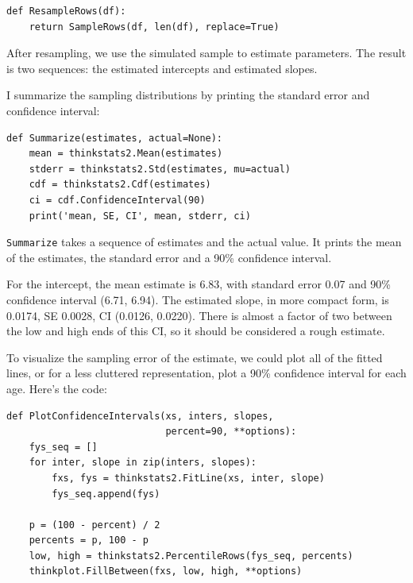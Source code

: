 \documentclass[12pt]{book}
\begin{document}
\begin{verbatim}
def ResampleRows(df):
    return SampleRows(df, len(df), replace=True)
\end{verbatim}

After resampling, we use the simulated sample to estimate parameters.
The result is two sequences: the estimated intercepts and estimated
slopes.

I summarize the sampling distributions by printing the standard
error and confidence interval:

\begin{verbatim}
def Summarize(estimates, actual=None):
    mean = thinkstats2.Mean(estimates)
    stderr = thinkstats2.Std(estimates, mu=actual)
    cdf = thinkstats2.Cdf(estimates)
    ci = cdf.ConfidenceInterval(90)
    print('mean, SE, CI', mean, stderr, ci)
\end{verbatim}

{\tt Summarize} takes a sequence of estimates and the actual value.
It prints the mean of the estimates, the standard error and 
a 90\% confidence interval.

For the intercept, the mean estimate is 6.83, with standard error
0.07 and 90\% confidence interval (6.71, 6.94).  The estimated slope, in
more compact form, is 0.0174, SE 0.0028, CI (0.0126, 0.0220).
There is almost a factor of two between the low and high ends of
this CI, so it should be considered a rough estimate.


To visualize the sampling error of the estimate, we could plot
all of the fitted lines, or for a less cluttered representation,
plot a 90\% confidence interval for each age.  Here's the code:

\begin{verbatim}
def PlotConfidenceIntervals(xs, inters, slopes,
                            percent=90, **options):
    fys_seq = []
    for inter, slope in zip(inters, slopes):
        fxs, fys = thinkstats2.FitLine(xs, inter, slope)
        fys_seq.append(fys)

    p = (100 - percent) / 2
    percents = p, 100 - p
    low, high = thinkstats2.PercentileRows(fys_seq, percents)
    thinkplot.FillBetween(fxs, low, high, **options)
\end{verbatim}
\end{document}
